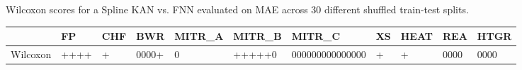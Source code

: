 \caption{Wilcoxon scores for a Spline KAN vs. FNN evaluated on MAE across 30 different shuffled train-test splits.}
\begin{tabular}{lllllllllll}
\toprule
 & FP & CHF & BWR & MITR_A & MITR_B & MITR_C & XS & HEAT & REA & HTGR \\
\midrule
Wilcoxon & ++++ & + & 0000+ & 0 & +++++0 & 000000000000000 & + & + & 0000 & 0000 \\
\bottomrule
\end{tabular}
